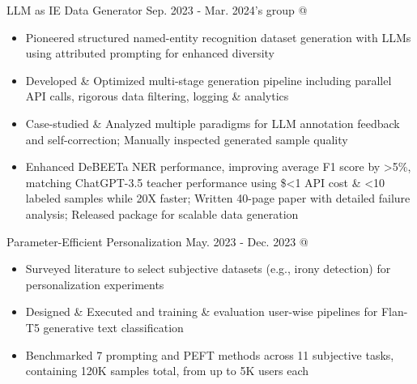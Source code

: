 \cveventSameLine{}
    {LLM as IE Data Generator}
    {Sep. 2023 - Mar. 2024}{'s group @ }
\begin{itemize}

    \item Pioneered structured named-entity recognition dataset generation with LLMs using attributed prompting for enhanced diversity

    \item Developed \& Optimized multi-stage generation pipeline including parallel API calls, rigorous data filtering, logging \& analytics

    \item Case-studied \& Analyzed multiple paradigms for LLM annotation feedback and self-correction; Manually inspected generated sample quality

    \item Enhanced DeBEETa NER performance, improving average F1 score by >5\%, matching ChatGPT-3.5 teacher performance
    using \$<1 API cost \& <10 labeled samples while 20X faster; Written 40-page paper with detailed failure analysis; Released package for scalable data generation
\end{itemize}
\dividerSmall


\cveventSameLine{}
    {Parameter-Efficient Personalization}
    {May. 2023 - Dec. 2023}{ @ }{}
\begin{itemize}

    \item Surveyed literature to select subjective datasets (e.g., irony detection) for personalization experiments

    \item Designed \& Executed  and 
    training \& evaluation user-wise pipelines for Flan-T5 generative text classification

    \item Benchmarked 7 prompting and PEFT methods across 11 subjective tasks, containing 120K samples total, from up to 5K users each
\end{itemize}
\dividerSmall





